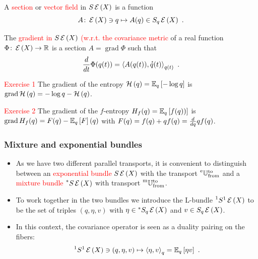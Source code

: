 \documentclass[xcolor=svgnames]{beamer}
\DeclareMathOperator{\grad}{grad}
\newcommand{\mixexpbundleat}[1]{\prescript{1}{}S^{1}\maxexpat{#1}}
\newcommand{\mixbundleat}[1]{\prescript{*}{}S\maxexpat{#1}}
\newcommand{\mixfiberat}[2]{{}^*S_{#1}\maxexpat{#2}}
\newcommand{\rosso}[1]{\textcolor{red}{#1}}
\renewcommand{\emph}{\rosso}
\begin{document}
\begin{frame}
\begin{block}{}
A \emph{section} or \emph{vector field} in $\expbundleat X$ is a function
\begin{equation*}
    A \colon \maxexpat X \ni q \mapsto A(q) \in \expfiberat q X \ .
\end{equation*}

The \emph{gradient in $\expbundleat X$ (w.r.t. the covariance metric} of a real function $\Phi \colon \maxexpat X \to \reals$ is a section $A = \grad \Phi$ such that 
\begin{equation*}
\derivby t \Phi(q(t)) = \scalarat {q(t)} {A(q(t))}{\velocity q(t)} \ .
\end{equation*}
\end{block}

\emph{Exercise 1} The gradient of the entropy $\entropyof q = \expectat q {- \log q}$ is
$\grad \entropyof q = -\log q - \entropyof q$.

\emph{Exercise 2} The gradient of the $f$-entropy $H_f(q) = \expectat q {f(q))}$ is $\grad H_f(q) = F(q) - \expectat q F(q)$ with $F(q) = f(q) + q f(q) = \derivby q q f(q)$. 
\end{frame}

\begin{frame}[plain]\small\frametitle{Mixture and exponential bundles}

  \begin{itemize}
    \item As we have two different parallel transports, it is convenient to distinguish between an \emph{exponential bundle} $\expbundleat X$ with the transport $\etransport {\text{from}}  {\text{to}}$ and a \emph{mixture bundle} $\mixbundleat X$ with transport $\mtransport {\text{from}}  {\text{to}}$.
    \item To work together in the two bundles we introduce the L-bundle $\mixexpbundleat X$ to be the set of triples $(q,\eta,v)$ with $\eta \in \mixfiberat q X$ and $v \in \expfiberat q X$.
    \item In this context, the covariance operator is seen as a duality pairing on the fibers:
      \begin{equation*}
        \mixexpbundleat X \ni (q,\eta,v) \mapsto \scalarat q \eta v = \expectat q {\eta v} \ .
      \end{equation*}
    \end{itemize}
  \end{frame}
\end{document}
